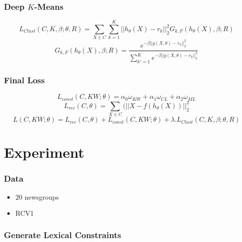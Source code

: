 \documentclass{beamer}
\begin{document}
\begin{frame}
  \frametitle{Deep $K$-Means }
\begin{equation*}
L_{Clust}(C, K, \beta; \theta, R) = \sum_{X \in C} \sum_{k=1}^K ||h_{\theta}(X) - r_k||_2^2 G_{k, F}(h_{\theta}(X), \beta; R)
\end{equation*}
\begin{equation*}
G_{k, F}(h_{\theta}(X), \beta; R) = \frac{e^{-\beta ||g(X, \theta) - r_k||_2^2}}
{\sum_{k' = 1}^K e^{-\beta ||g(X, \theta) - r_k||_2^2}}
\end{equation*}
\end{frame}

\begin{frame}
\frametitle{Final Loss}
\begin{equation*}
  L_{const}(C, KW;\theta) = \alpha_0\omega_{KW} + \alpha_1\omega_{CL} + \alpha_2\omega_{ML}  
\end{equation*}
\pause
\begin{equation*}
  L_{rec}(C, \theta) = \sum_{X \in C}(||X - f(h_\theta(X))||_2^2
\end{equation*}
\pause
\begin{equation*}
  L(C,KW; \theta) = L_{rec}(C, \theta) + L_{const}(C, KW;\theta) + \lambda.L_{Clust}(C, K, \beta; \theta, R)   
\end{equation*}
\end{frame}

\section{Experiment}

\begin{frame}
  \frametitle{Data}
  \begin{itemize}
    \setlength\itemsep{2em}
  \item 20 newsgroups
  \item RCV1 
  \end{itemize}
\end{frame}

\begin{frame}
\frametitle{Generate Lexical Constraints}
\end{frame}
\end{document}

